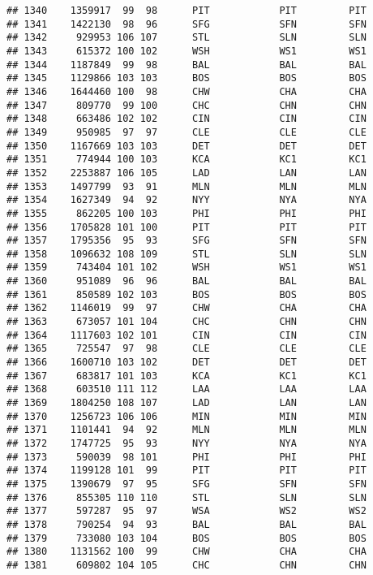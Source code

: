 \documentclass[]{article}
\begin{document}
\begin{verbatim}
## 1340    1359917  99  98      PIT            PIT         PIT
## 1341    1422130  98  96      SFG            SFN         SFN
## 1342     929953 106 107      STL            SLN         SLN
## 1343     615372 100 102      WSH            WS1         WS1
## 1344    1187849  99  98      BAL            BAL         BAL
## 1345    1129866 103 103      BOS            BOS         BOS
## 1346    1644460 100  98      CHW            CHA         CHA
## 1347     809770  99 100      CHC            CHN         CHN
## 1348     663486 102 102      CIN            CIN         CIN
## 1349     950985  97  97      CLE            CLE         CLE
## 1350    1167669 103 103      DET            DET         DET
## 1351     774944 100 103      KCA            KC1         KC1
## 1352    2253887 106 105      LAD            LAN         LAN
## 1353    1497799  93  91      MLN            MLN         MLN
## 1354    1627349  94  92      NYY            NYA         NYA
## 1355     862205 100 103      PHI            PHI         PHI
## 1356    1705828 101 100      PIT            PIT         PIT
## 1357    1795356  95  93      SFG            SFN         SFN
## 1358    1096632 108 109      STL            SLN         SLN
## 1359     743404 101 102      WSH            WS1         WS1
## 1360     951089  96  96      BAL            BAL         BAL
## 1361     850589 102 103      BOS            BOS         BOS
## 1362    1146019  99  97      CHW            CHA         CHA
## 1363     673057 101 104      CHC            CHN         CHN
## 1364    1117603 102 101      CIN            CIN         CIN
## 1365     725547  97  98      CLE            CLE         CLE
## 1366    1600710 103 102      DET            DET         DET
## 1367     683817 101 103      KCA            KC1         KC1
## 1368     603510 111 112      LAA            LAA         LAA
## 1369    1804250 108 107      LAD            LAN         LAN
## 1370    1256723 106 106      MIN            MIN         MIN
## 1371    1101441  94  92      MLN            MLN         MLN
## 1372    1747725  95  93      NYY            NYA         NYA
## 1373     590039  98 101      PHI            PHI         PHI
## 1374    1199128 101  99      PIT            PIT         PIT
## 1375    1390679  97  95      SFG            SFN         SFN
## 1376     855305 110 110      STL            SLN         SLN
## 1377     597287  95  97      WSA            WS2         WS2
## 1378     790254  94  93      BAL            BAL         BAL
## 1379     733080 103 104      BOS            BOS         BOS
## 1380    1131562 100  99      CHW            CHA         CHA
## 1381     609802 104 105      CHC            CHN         CHN

\end{verbatim}
\end{document}
